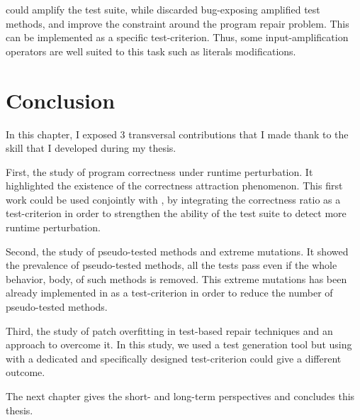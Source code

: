 \dspot could amplify the test suite, while discarded bug-exposing amplified test methods, and improve the constraint around the program repair problem.
This can be implemented as a specific test-criterion.
Thus, some input-amplification operators are well suited to this task such as literals modifications.

\section{Conclusion}
\label{sec:transversal-contributions:conclusion}

In this chapter, I exposed 3 transversal contributions that I made thank to the skill that I developed during my thesis.

First, the study of program correctness under runtime perturbation.
It highlighted the existence of the correctness attraction phenomenon.
This first work could be used conjointly with \dspot, by integrating the correctness ratio as a test-criterion in order to strengthen the ability of the test suite to detect more runtime perturbation.

Second, the study of pseudo-tested methods and extreme mutations.
It showed the prevalence of pseudo-tested methods, all the tests pass even if the whole behavior, \ie body, of such methods is removed.
This extreme mutations has been already implemented in \dspot as a test-criterion in order to reduce the number of pseudo-tested methods.

Third, the study of patch overfitting in test-based repair techniques and an approach to overcome it.
In this study, we used a test generation tool but using \dspot with a dedicated and specifically designed test-criterion could give a different outcome.

The next chapter gives the short- and long-term perspectives and concludes this thesis.